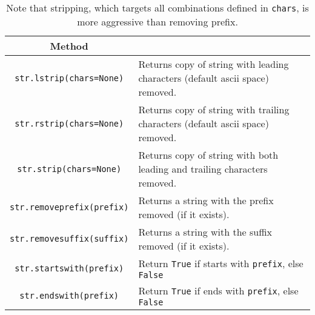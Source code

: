     \begin{definition} 
      \begin{table}[H]
        \centering
        \begin{tabular}{|c|p{10cm}|}
          \hline
          \textbf{Method} & \textbf{} \\
          \hline
          \texttt{str.lstrip(chars=None)} & Returns copy of string with leading characters (default ascii space) removed. \\
          \texttt{str.rstrip(chars=None)} & Returns copy of string with trailing characters (default ascii space) removed. \\
          \texttt{str.strip(chars=None)} & Returns copy of string with both leading and trailing characters removed. \\
          \texttt{str.removeprefix(prefix)} & Returns a string with the prefix removed (if it exists). \\
          \texttt{str.removesuffix(suffix)} & Returns a string with the suffix removed (if it exists). \\ 
          \texttt{str.startswith(prefix)} & Return \texttt{True} if starts with \texttt{prefix}, else \texttt{False} \\ 
          \texttt{str.endswith(prefix)} & Return \texttt{True} if ends with \texttt{prefix}, else \texttt{False} \\  
          \hline
        \end{tabular}
        \caption{Note that stripping, which targets all combinations defined in \texttt{chars}, is more aggressive than removing prefix. }
      \end{table}
    \end{definition} 

